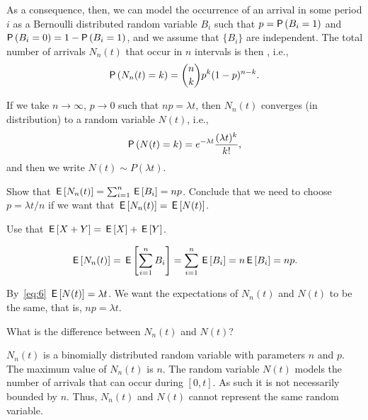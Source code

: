 As a consequence, then, we can model the occurrence of an arrival in
some period $i$ as a Bernoulli distributed random variable $B_i$ such
that $p=\P{B_i =1}$ and $\P{B_i=0} = 1-\P{B_i = 1}$, and we assume that
$\{B_i\}$ are independent. The total number of arrivals $N_n(t)$ that
occur in $n$ intervals is then , i.e., 
\begin{equation}\label{eq:bin}
  \P{N_n(t) = k} = {n \choose k} p^k (1-p)^{n-k}.
\end{equation}

If we take $n\to\infty$, $p\to0$ such that $n p=\lambda t$, then $N_n(t)$ converges (in distribution) to a  random variable $N(t)$, i.e., 
\begin{equation}\label{eq:pois}
  \P{N(t) = k} = 
e^{-\lambda t} \frac{(\lambda t)^k}{k!}, 
\end{equation}
and then we write $N(t)\sim P(\lambda t)$.


\begin{extra}
Show that $\,\mathsf{E}\left[N_n(t)\right] = \sum_{i=1}^n \,\mathsf{E}\left[B_i\right] = n p$. Conclude that we need to choose $p = \lambda t/n$ if we want that $\,\mathsf{E}\left[N_n(t)\right] = \,\mathsf{E}\left[N(t)\right]$.
\begin{hint}
Use that $\,\mathsf{E}\left[X+Y\right] = \,\mathsf{E}\left[X\right] + \,\mathsf{E}\left[Y\right]$. 
\end{hint}
\begin{solution}
  \begin{equation*}
    \,\mathsf{E}\left[N_n(t)\right] = \,\mathsf{E}\left[\sum_{i=1}^n {B_i}\right] = \sum_{i=1}^n \,\mathsf{E}\left[B_i\right] = n \,\mathsf{E}\left[B_i\right] = n p.
  \end{equation*}

 By~\eqref{eq:6} $\,\mathsf{E}\left[N(t)\right] = \lambda t$.  We want the expectations of $N_n(t)$ and $N(t)$ to be the same,  that is, $n p = \lambda t$. 
\end{solution}
\end{extra}

\begin{extra}
What is the difference between $N_n(t)$ and $N(t)$?
\begin{solution}
  $N_n(t)$ is a binomially distributed random variable with parameters $n$ and $p$.
  The maximum value of $N_n(t)$ is $n$.
  The random variable $N(t)$ models the number of arrivals that can occur during $[0,t]$.
  As such it is not necessarily bounded by $n$.
  Thus, $N_n(t)$ and $N(t)$ cannot represent the same random variable.
\end{solution}
\end{extra}

